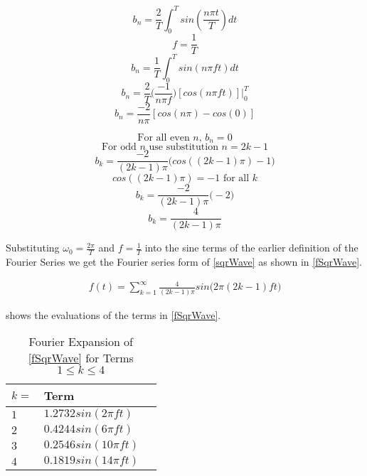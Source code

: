 \documentclass[main.tex]{subfile}
\begin{document}
	$$b_n = \frac{2}{T} \int_{0}^{T} sin(\frac{n \pi t}{T}) dt$$
	$$f = \frac{1}{T}$$
	$$b_n = \frac{1}{T} \int_{0}^{T} sin(n \pi f t) dt$$
	$$b_n = \frac{2}{T} \Big(\frac{-1}{n \pi f}\Big) [cos(n \pi f t)] \Big|_0^T$$
	$$b_n = \frac{-2}{n \pi} [cos(n \pi) - cos(0)]$$
	
	$$\text{For all even $n$, } b_n = 0$$
	$$\text{For odd $n$ use substitution $n = 2k-1$}$$
	$$b_k = \frac{-2}{(2k-1) \pi} \Big(cos((2k-1) \pi) - 1 \Big)$$
	$$cos((2k-1) \pi) = -1 \text{ for all $k$}$$
	$$b_k = \frac{-2}{(2k-1) \pi} \Big(-2 \Big)$$
	$$b_k = \frac{4}{(2k-1) \pi}$$
	
	Substituting $\omega_0 = \frac{2 \pi}{T}$ and $f = \frac{1}{T}$ into the sine
	terms of the earlier definition of the Fourier Series we get the Fourier
	series form of \eqref{sqrWave} as shown in \eqref{fSqrWave}.
	
	\begin{align}
	f(t) = \sum_{k=1}^{\infty} \frac{4}{(2k-1) \pi} sin\Big(2 \pi (2k-1) f t \Big)
	\label{eq:fSqrWave}
	\end{align}

	 shows the evaluations of the terms in \eqref{fSqrWave}.

	\begin{table}[H]
	  \begin{center}
			\caption{Fourier Expansion of \eqref{fSqrWave} for Terms $1 \leq k \leq 4$}
			\label{tab:termExpansion}
	    \begin{tabular}{lll}
	      \\ \toprule
				$k =$ & Term
	      \\ \midrule
				$1$ & $1.2732 sin(2 \pi f t)$
				\\$2$ &	$0.4244 sin(6 \pi f t)$
				\\$3$	&	$0.2546 sin(10 \pi f t)$
				\\$4$	&	$0.1819 sin(14 \pi f t)$
	      \\ \bottomrule
	    \end{tabular}
	  \end{center}
	\end{table}
	
\end{document}
